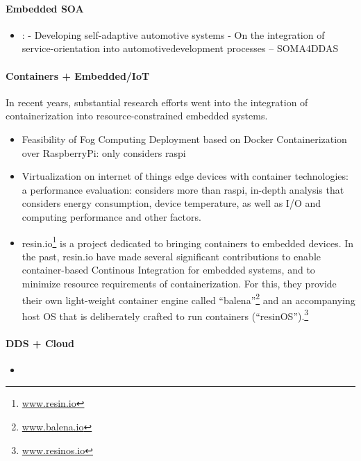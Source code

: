 \paragraph{Embedded SOA}

\begin{itemize}
\item \cite{wagner2014developing}: \citeauthor*{wagner2014developing} - Developing self-adaptive automotive systems - On the integration of service-orientation into automotivedevelopment processes -- SOMA4DDAS
\end{itemize}


\paragraph{Containers + Embedded/IoT}
In recent years, substantial research efforts went into the integration of containerization into resource-constrained embedded systems. 
\begin{itemize}
	\item \cite{bellavista2017feasibility} Feasibility of Fog Computing Deployment based on Docker Containerization over RaspberryPi: only considers raspi
	\item \cite{morabito2017virtualization} Virtualization on internet of things edge devices with container technologies: a performance evaluation: considers more than raspi, in-depth analysis that considers energy consumption, device temperature, as well as I/O and computing performance and other factors.
	\item resin.io\footnote{\url{www.resin.io}} is a project dedicated to bringing containers to embedded devices. In the past, resin.io have made several significant contributions to enable container-based Continous Integration for embedded systems, and to minimize resource requirements of containerization. For this, they provide their own light-weight container engine called ``balena''\footnote{\url{www.balena.io}} and an accompanying host OS that is deliberately crafted to run containers (``resinOS'').\footnote{\url{www.resinos.io}}
\end{itemize}




\paragraph{DDS + Cloud}
\begin{itemize}
	\item %
\end{itemize}

